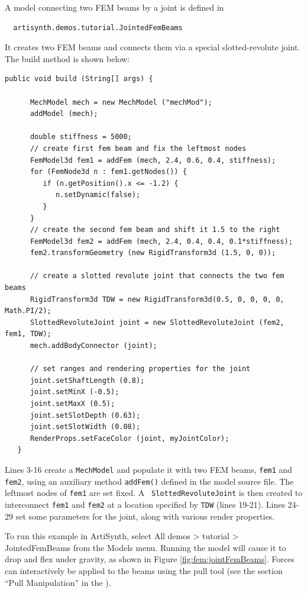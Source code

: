 A model connecting two FEM beams by a joint
is defined in
%
\begin{verbatim}
  artisynth.demos.tutorial.JointedFemBeams
\end{verbatim}
%
It creates two FEM beams and connects them via a special slotted-revolute
joint. The build method is shown below:
\lstset{numbers=left}
\begin{lstlisting}[]
   public void build (String[] args) {
      
      MechModel mech = new MechModel ("mechMod");
      addModel (mech);
      
      double stiffness = 5000;
      // create first fem beam and fix the leftmost nodes      
      FemModel3d fem1 = addFem (mech, 2.4, 0.6, 0.4, stiffness);
      for (FemNode3d n : fem1.getNodes()) {
         if (n.getPosition().x <= -1.2) {
            n.setDynamic(false);
         }
      }
      // create the second fem beam and shift it 1.5 to the right
      FemModel3d fem2 = addFem (mech, 2.4, 0.4, 0.4, 0.1*stiffness);
      fem2.transformGeometry (new RigidTransform3d (1.5, 0, 0));

      // create a slotted revolute joint that connects the two fem beams
      RigidTransform3d TDW = new RigidTransform3d(0.5, 0, 0, 0, 0, Math.PI/2);
      SlottedRevoluteJoint joint = new SlottedRevoluteJoint (fem2, fem1, TDW);
      mech.addBodyConnector (joint);
      
      // set ranges and rendering properties for the joint
      joint.setShaftLength (0.8);
      joint.setMinX (-0.5);
      joint.setMaxX (0.5);
      joint.setSlotDepth (0.63);
      joint.setSlotWidth (0.08);
      RenderProps.setFaceColor (joint, myJointColor);
   }
\end{lstlisting}
\lstset{numbers=none} Lines 3-16 create a {\tt MechModel} and
populate it with two FEM beams, {\tt fem1} and {\tt fem2}, using an
auxiliary method {\tt addFem()} defined in the model source file.  The
leftmost nodes of {\tt fem1} are set fixed. A {\tt
SlottedRevoluteJoint} is then created to interconnect {\tt fem1} and
{\tt fem2} at a location specified by {\tt TDW} (lines 19-21).  Lines
24-29 set some parameters for the joint, along with various render
properties.

To run this example in ArtiSynth, select {\sf All demos > tutorial >
JointedFemBeams} from the {\sf Models} menu. Running the model will
cause it to drop and flex under gravity, as shown in Figure
\ref{fig:fem:jointFemBeams}. Forces can interactively
be applied to the beams using
the pull tool
(see the section ``Pull Manipulation'' in the
).

